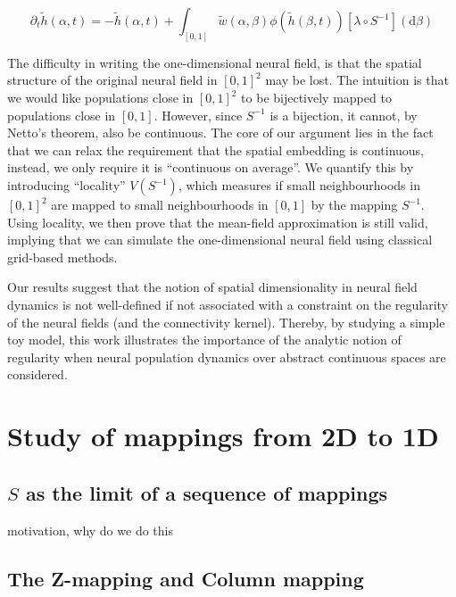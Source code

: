 \documentclass[NETN,manuscript]{stjour-new}
\def\d{\mathrm d}
\begin{document}
\begin{equation} \label{eq:nf-in-01}
\partial_t \tilde h(\alpha, t) = -\tilde h(\alpha, t) + \int_{[0,1]} \tilde w(\alpha, \beta) \phi(\tilde h(\beta, t)) \left[\lambda \circ S^{-1}\right](\d \beta)
\end{equation}

The difficulty in writing the one-dimensional neural field, is that the spatial structure of the original neural field in $[0,1]^2$ may be lost. The intuition is that we would like populations close in $[0,1]^2$ to be bijectively mapped to populations close in $[0,1]$. However, since $S^{-1}$ is a bijection, it cannot, by Netto's theorem, also be continuous. The core of our argument lies in the fact that we can relax the requirement that the spatial embedding is continuous, instead, we only require it is ``continuous on average''. We quantify this by introducing ``locality'' $V(S^{-1})$, which measures if small neighbourhoods in $[0,1]^2$ are mapped to small neighbourhoods in $[0,1]$ by the mapping $S^{-1}$. Using locality, we then prove that the mean-field approximation is still valid, implying that we can simulate the one-dimensional neural field using classical grid-based methods.




Our results suggest that the notion of spatial dimensionality in neural field dynamics is not well-defined if not associated with a constraint on the regularity of the neural fields (and the connectivity kernel). Thereby, by studying a simple toy model, this work illustrates the importance of the analytic notion of regularity when neural population dynamics over abstract continuous spaces are considered. 

\section{Study of mappings from 2D to 1D}

\subsection{$S$ as the limit of a sequence of mappings}

motivation, why do we do this

\subsection{The Z-mapping and Column mapping}
\end{document}
